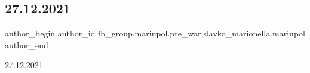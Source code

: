  
 
 
 
 

\subsection{27.12.2021}
\label{sec:12_02_2023.fb.fb_group.mariupol.pre_war.10.27_12_2021}
 
\ifcmt
 author_begin
   author_id fb_group.mariupol.pre_war,slavko_marionella.mariupol
 author_end
\fi

27.12.2021

